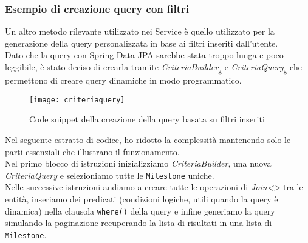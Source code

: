 \subsubsection{Esempio di creazione query con filtri}
Un altro metodo rilevante utilizzato nei Service è quello utilizzato per la generazione della query personalizzata in base ai filtri inseriti dall'utente.\\
Dato che la query con Spring Data JPA sarebbe stata troppo lunga e poco leggibile, è stato deciso di crearla tramite \textit{CriteriaBuilder}\textsubscript{g} e \textit{CriteriaQuery}\textsubscript{g} che permettono di creare query dinamiche in modo programmatico.
\begin{figure}[H] 
    \centering 
    \texttt{[image: criteriaquery]} 
    \caption{Code snippet della creazione della query basata su filtri inseriti}
\end{figure}
\noindent Nel seguente estratto di codice, ho ridotto la complessità mantenendo solo le parti essenziali che illustrano il funzionamento.\\
Nel primo blocco di istruzioni inizializziamo \textit{CriteriaBuilder}, una nuova \textit{CriteriaQuery} e selezioniamo tutte le \texttt{Milestone} uniche.\\
Nelle successive istruzioni andiamo a creare tutte le operazioni di \textit{Join<>} tra le entità, inseriamo dei predicati (condizioni logiche, utili quando la query è dinamica) nella clausola \texttt{where()} della query e infine generiamo la query simulando la paginazione recuperando la lista di risultati in una lista di \texttt{Milestone}.

